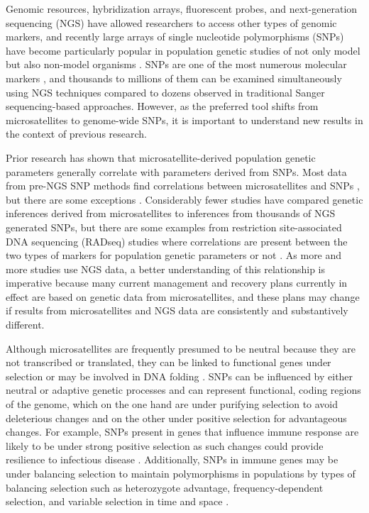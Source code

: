 \documentclass[english]{article}\usepackage[]{graphicx}\usepackage[]{color}
\begin{document}
Genomic resources, hybridization arrays, fluorescent probes, and next-generation sequencing (NGS) have allowed researchers to access other types of genomic markers, and recently large arrays of single nucleotide polymorphisms (SNPs) have become particularly popular in population genetic studies of not only model but also non-model organisms \citep{Allendorf_et_al_2010}. SNPs are one of the most numerous molecular markers \citep{Gupta_et_al_2001}, and thousands to millions of them can be examined simultaneously using NGS techniques compared to dozens observed in traditional Sanger sequencing-based approaches. However, as the preferred tool shifts from microsatellites to genome-wide SNPs, it is important to understand new results in the context of previous research. 

Prior research has shown that microsatellite-derived population genetic parameters generally correlate with parameters derived from SNPs. Most data from pre-NGS SNP methods find correlations between microsatellites and SNPs \citep[e.g.,][]{Ryynanen_et_al_2007, Narum_et_al_2008, Coates_et_al_2009, Glover_et_al_2010, Garke_et_al_2012}, but there are some exceptions \citep[e.g.,][]{Vali_et_al_2008, DeFaveri_et_al_2013}. Considerably fewer studies have compared genetic inferences derived from microsatellites to inferences from thousands of NGS generated SNPs, but there are some examples from restriction site-associated DNA sequencing (RADseq) studies where correlations are present \citep{Jeffries_et_al_2016} between the two types of markers for population genetic parameters  or not \citep{Lozier_2014}. As more and more studies use NGS data, a better understanding of this relationship is imperative because many current management and recovery plans currently in effect are based on genetic data from microsatellites, and these plans may change if results from microsatellites and NGS data are consistently and substantively different.

Although microsatellites are frequently presumed to be neutral because they are not transcribed or translated,  they can be linked to functional genes under selection \citep[e.g.,][]{Vasemagi_et_al_2005, Li_et_al_2014} or may be involved in DNA folding \citep{Li_et_al_2002}. SNPs can be influenced by either neutral or adaptive genetic processes and can represent functional, coding regions of the genome, which on the one hand are under purifying selection to avoid deleterious changes and on the other under positive selection for advantageous changes. For example, SNPs present in genes that influence immune response are likely to be under strong positive selection as such changes could provide resilience to infectious disease \citep{Bernatchez_and_Landry_2003, Sommer_2005}. Additionally, SNPs in immune genes may be under balancing selection to maintain polymorphisms in populations \citep[e.g.,][]{Niskanen_et_al_2014} by types of balancing selection such as heterozygote advantage, frequency-dependent selection, and variable selection in time and space \citep{Hedrick_1999}.
\end{document}

